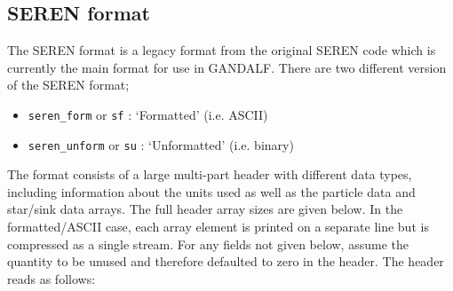 \documentclass[a4paper]{article}
\newcommand{\var}[1]{\texttt{#1}}
\begin{document}
\subsection{SEREN format}
\label{Sec:SerenForm}
The SEREN format is a legacy format from the original SEREN code which is currently the main format for use in GANDALF.  There are two different version of the SEREN format;
\begin{itemize}
\item \var{seren\_form} or \var{sf} : `Formatted' (i.e. ASCII)
\item \var{seren\_unform} or \var{su} : `Unformatted' (i.e. binary)
\end{itemize}
The format consists of a large multi-part header with different data types, including information about the units used as well as the particle data and star/sink data arrays.  The full header array sizes are given below.  In the formatted/ASCII case, each array element is printed on a separate line but is compressed as a single stream.  For any fields not given below, assume the quantity to be unused and therefore defaulted to zero in the header.  The header reads as follows:
\end{document}
